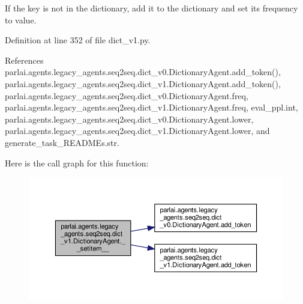 \begin{DoxyVerb}If the key is not in the dictionary, add it to the dictionary and set
its frequency to value.
\end{DoxyVerb}
 

Definition at line 352 of file dict\+\_\+v1.\+py.



References parlai.\+agents.\+legacy\+\_\+agents.\+seq2seq.\+dict\+\_\+v0.\+Dictionary\+Agent.\+add\+\_\+token(), parlai.\+agents.\+legacy\+\_\+agents.\+seq2seq.\+dict\+\_\+v1.\+Dictionary\+Agent.\+add\+\_\+token(), parlai.\+agents.\+legacy\+\_\+agents.\+seq2seq.\+dict\+\_\+v0.\+Dictionary\+Agent.\+freq, parlai.\+agents.\+legacy\+\_\+agents.\+seq2seq.\+dict\+\_\+v1.\+Dictionary\+Agent.\+freq, eval\+\_\+ppl.\+int, parlai.\+agents.\+legacy\+\_\+agents.\+seq2seq.\+dict\+\_\+v0.\+Dictionary\+Agent.\+lower, parlai.\+agents.\+legacy\+\_\+agents.\+seq2seq.\+dict\+\_\+v1.\+Dictionary\+Agent.\+lower, and generate\+\_\+task\+\_\+\+R\+E\+A\+D\+M\+Es.\+str.

Here is the call graph for this function\+:
\nopagebreak
\begin{figure}[H]
\begin{center}
\leavevmode
\includegraphics[width=350pt]{classparlai_1_1agents_1_1legacy__agents_1_1seq2seq_1_1dict__v1_1_1DictionaryAgent_ad9c574fe8296f3058148b6c4d91f7d09_cgraph}
\end{center}
\end{figure}
\mbox{\label{classparlai_1_1agents_1_1legacy__agents_1_1seq2seq_1_1dict__v1_1_1DictionaryAgent_aaf643731fb8c436d729c5dc97c10c758}} 
